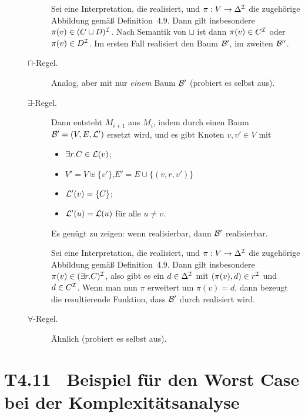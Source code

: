 \documentclass[fontsize=11pt, twoside=false, numbers=autoenddot]{scrbook}
\begin{document}
\begin{beweis}
\begin{description}
\begin{description}
          Sei \Imc eine Interpretation, die \Bmc realisiert,
          und $\pi : V \to \Delta^\mathcal{I}$ die zugehörige Abbildung gemäß Definition~4.9.
          Dann gilt insbesondere $\pi(v) \in (C \sqcup D)^\mathcal{I}$.
          Nach Semantik von $\sqcup$ ist dann $\pi(v) \in C^\mathcal{I}$ oder $\pi(v) \in D^\mathcal{I}$.
          Im ersten Fall realisiert \Imc den Baum $\mathcal{B}'$, im zweiten $\mathcal{B}''$.
        \item[{\boldmath $\sqcap$-Regel.}]
          Analog, aber mit nur \emph{einem} Baum $\mathcal{B}'$ (probiert es selbst aus).
        \item[{\boldmath $\exists$-Regel.}]
          Dann entsteht $M_{i+1}$ aus $M_i$,
          indem \Bmc durch einen Baum $\mathcal{B}' = (V,E,\mathcal{L}')$ ersetzt wird,
          und es gibt Knoten $v,v' \in V$ mit
          \begin{itemize}
            \item
              $\exists r.C \in \mathcal{L}(v)$;
            \item
              $V' = V \uplus \{v'\}$,\quad $E' = E \cup \{(v,r,v')\}$
            \item
              $\mathcal{L}'(v) = \{C\}$;
            \item
              $\mathcal{L}'(u) = \mathcal{L}(u)$ für alle $u \neq v$.
          \end{itemize}
          Es genügt zu zeigen: wenn \Bmc realisierbar, dann $\mathcal{B}'$ realisierbar.

          Sei \Imc eine Interpretation, die \Bmc realisiert,
          und $\pi : V \to \Delta^\mathcal{I}$ die zugehörige Abbildung gemäß Definition~4.9.
          Dann gilt insbesondere $\pi(v) \in (\exists r.C)^\mathcal{I}$,
          also gibt es ein $d \in \Delta^\mathcal{I}$ mit $(\pi(v),d) \in r^\mathcal{I}$
          und $d \in C^\mathcal{I}$.
          Wenn man nun $\pi$ erweitert um $\pi(v) = d$,
          dann bezeugt die resultierende Funktion,
          dass $\mathcal{B}'$ durch \Imc realisiert wird.
        \item[{\boldmath $\forall$-Regel.}]
          Ähnlich (probiert es selbst aus).
          \qedhere
      \end{description}
  \end{description}
\end{beweis}

\section*{T4.11~ Beispiel für den Worst Case bei der Komplexitätsanalyse}
\end{document}
